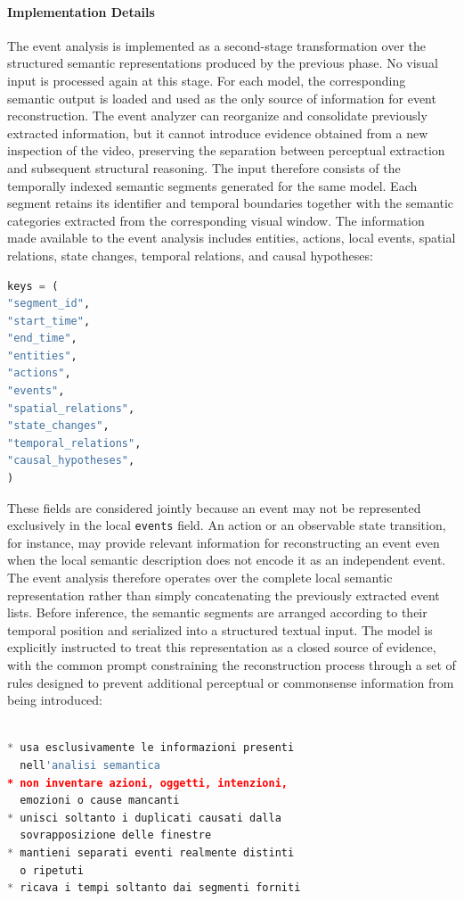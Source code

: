 \paragraph{Implementation Details}
The event analysis is implemented as a second-stage transformation over the structured semantic representations produced by the previous phase. No visual input is processed again at this stage. For each model, the corresponding semantic output is loaded and used as the only source of information for event reconstruction. The event analyzer can reorganize and consolidate previously extracted information, but it cannot introduce evidence obtained from a new inspection of the video, preserving the separation between perceptual extraction and subsequent structural reasoning.
The input therefore consists of the temporally indexed semantic segments generated for the same model. Each segment retains its identifier and temporal boundaries together with the semantic categories extracted from the corresponding visual window. The information made available to the event analysis includes entities, actions, local events, spatial relations, state changes, temporal relations, and causal hypotheses:
\begin{lstlisting}[language=Python]
keys = (
"segment_id",
"start_time",
"end_time",
"entities",
"actions",
"events",
"spatial_relations",
"state_changes",
"temporal_relations",
"causal_hypotheses",
)
\end{lstlisting}
These fields are considered jointly because an event may not be represented exclusively in the local \texttt{events} field. An action or an observable state transition, for instance, may provide relevant information for reconstructing an event even when the local semantic description does not encode it as an independent event. The event analysis therefore operates over the complete local semantic representation rather than simply concatenating the previously extracted event lists.
Before inference, the semantic segments are arranged according to their temporal position and serialized into a structured textual input. The model is explicitly instructed to treat this representation as a closed source of evidence, with the common prompt constraining the reconstruction process through a set of rules designed to prevent additional perceptual or commonsense information from being introduced:
\begin{lstlisting}[language=Python]

* usa esclusivamente le informazioni presenti
  nell'analisi semantica
* non inventare azioni, oggetti, intenzioni,
  emozioni o cause mancanti
* unisci soltanto i duplicati causati dalla
  sovrapposizione delle finestre
* mantieni separati eventi realmente distinti
  o ripetuti
* ricava i tempi soltanto dai segmenti forniti
\end{lstlisting}
